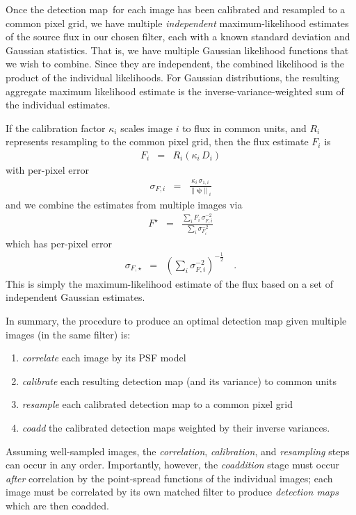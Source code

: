 \documentclass[letterpaper,preprint]{aastex62}
\newcommand{\detmap}{detection map}
\newcommand{\psf}{\psi}
\newcommand{\psfnorm}{\norm{\bm{\psf}}}
\newcommand{\norm}[1]{\left\lVert #1 \right\rVert}
\begin{document}
Once the \detmap\ for each image has been calibrated and resampled to
a common pixel grid, we have multiple \emph{independent}
maximum-likelihood estimates of the source flux in our chosen filter,
each with a known standard deviation and Gaussian statistics.  That
is, we have multiple Gaussian likelihood functions that we wish to
combine.  Since they are independent, the combined likelihood is the
product of the individual likelihoods.  For Gaussian distributions,
the resulting aggregate maximum likelihood estimate is the
inverse-variance-weighted sum of the individual estimates.

If the calibration factor $\kappa_i$ scales image $i$ to flux in
common units, and $R_i$ represents resampling to the common pixel grid,
then the flux estimate $F_i$ is
\begin{eqnarray}
F_i &=& R_i(\kappa_i \, D_i)
\end{eqnarray}
with per-pixel error
\begin{eqnarray}
\sigma_{F, i} &=& \frac{\kappa_i \, \sigma_{1,i}}{\psfnorm_i}
\end{eqnarray}
and we combine the estimates from multiple images via
\begin{eqnarray}
F^{\star} &=& \frac{\displaystyle\sum_i F_i \, \sigma^{-2}_{F,i}}{\displaystyle\sum_i \sigma^{-2}_{F_i}}
\label{eq:onebandmap}
\end{eqnarray}
which has per-pixel error
\begin{eqnarray}
  \sigma_{F, \star} &=& \left( \sum_i \sigma^{-2}_{F,i} \right)^{-\frac{1}{2}}    \quad .
  \label{eq:onebandstd}
\end{eqnarray}
This is simply the maximum-likelihood estimate of the flux based on a
set of independent Gaussian estimates.


In summary, the procedure to produce an optimal detection map given
multiple images (in the same filter) is:
\begin{enumerate}
\item \emph{correlate} each image by its PSF model
\item \emph{calibrate} each resulting detection map (and its variance)
  to common units
\item \emph{resample} each calibrated detection map to a common pixel
  grid
\item \emph{coadd} the calibrated detection maps weighted by their
  inverse variances.
\end{enumerate}
Assuming well-sampled images, the \emph{correlation},
\emph{calibration}, and \emph{resampling} steps can occur in any
order.  Importantly, however, the \emph{coaddition} stage must occur
\emph{after} correlation by the point-spread functions of the
individual images; each image must be correlated by its own matched
filter to produce \emph{detection maps} which are then coadded.
\end{document}
